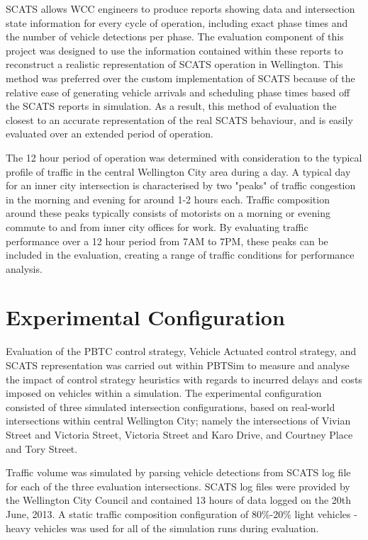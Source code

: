 SCATS allows WCC engineers to produce reports showing data and intersection state information for every cycle of operation, including exact phase times and the number of vehicle detections per phase. The evaluation component of this project was designed to use the information contained within these reports to reconstruct a realistic representation of SCATS operation in Wellington. This method was preferred over the custom implementation of SCATS because of the relative ease of generating vehicle arrivals and scheduling phase times based off the SCATS reports in simulation. As a result, this method of evaluation the closest to an accurate representation of the real SCATS behaviour, and is easily evaluated over an extended period of operation. 

The 12 hour period of operation was determined with consideration to the typical profile of traffic in the central Wellington City area during a day. A typical day for an inner city intersection is characterised by two "peaks" of traffic congestion in the morning and evening for around 1-2 hours each. Traffic composition around these peaks typically consists of motorists on a morning or evening commute to and from inner city offices for work. By evaluating traffic performance over a 12 hour period from 7AM to 7PM, these peaks can be included in the evaluation, creating a range of traffic conditions for performance analysis. 

\section{Experimental Configuration}

Evaluation of the PBTC control strategy, Vehicle Actuated control strategy, and SCATS representation was carried out within PBTSim to measure and analyse the impact of control strategy heuristics with regards to incurred delays and costs imposed on vehicles within a simulation. The experimental configuration consisted of three simulated intersection configurations, based on real-world intersections within central Wellington City; namely the intersections of Vivian Street and Victoria Street, Victoria Street and Karo Drive, and Courtney Place and Tory Street. 

Traffic volume was simulated by parsing vehicle detections from SCATS log file for each of the three evaluation intersections. SCATS log files were provided by the Wellington City Council and contained 13 hours of data logged on the 20th June, 2013. A static traffic composition configuration of 80\%-20\% light vehicles - heavy vehicles was used for all of the simulation runs during evaluation.

